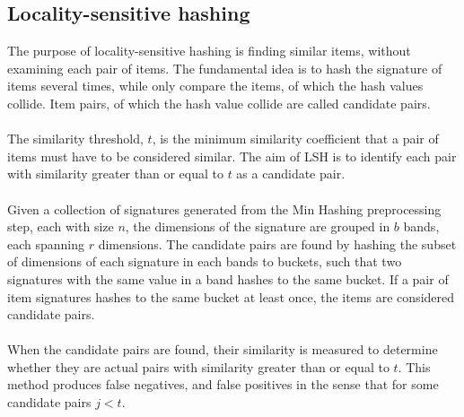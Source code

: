 \subsection{Locality-sensitive hashing}
The purpose of locality-sensitive hashing is finding similar items, without examining each pair of items. The fundamental idea is to hash the signature of items several times, while only compare the items, of which the hash values collide. Item pairs, of which the hash value collide are called candidate pairs.\\ \\
The similarity threshold, \(t\), is the minimum similarity coefficient that a pair of items must have to be considered similar. The aim of LSH is to identify each pair with similarity greater than or equal to \(t\) as a candidate pair.\\ \\
Given a collection of signatures generated from the Min Hashing preprocessing step, each with size \(n\), the dimensions of the signature are grouped in \(b\) bands, each spanning \(r\) dimensions. The candidate pairs are found by hashing the subset of dimensions of each signature in each bands to buckets, such that two signatures with the same value in a band hashes to the same bucket. If a pair of item signatures hashes to the same bucket at least once, the items are considered candidate pairs. \\ \\
When the candidate pairs are found, their similarity is measured to determine whether they are actual pairs with similarity greater than or equal to \(t\). This method produces false negatives, and false positives in the sense that for some candidate pairs \(j<t\).

